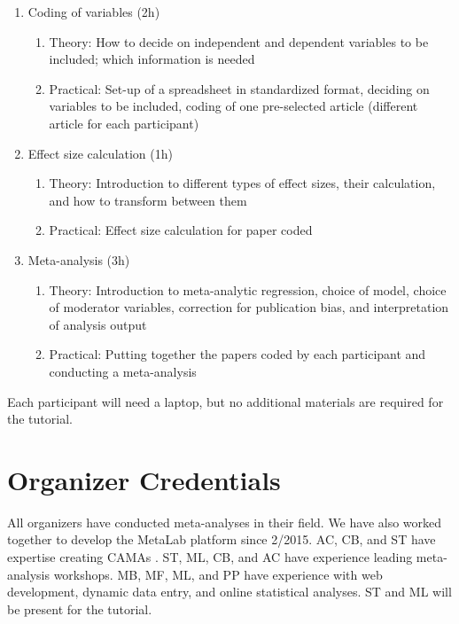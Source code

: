 \documentclass[10pt,letterpaper]{article}
\begin{document}
\begin{enumerate}
    \item Coding of variables (2h)
    \begin{enumerate}
        \item Theory: How to decide on independent and dependent variables to be included; which information is needed
        \item Practical: Set-up of a spreadsheet in standardized format, deciding on variables to be included, coding of one pre-selected article (different article for each participant)
    \end{enumerate}
    \item Effect size calculation (1h)
    \begin{enumerate}
        \item Theory: Introduction to different types of effect sizes, their calculation, and how to transform between them
        \item Practical: Effect size calculation for paper coded
    \end{enumerate}
    \item Meta-analysis (3h)%
    \begin{enumerate}
        \item Theory: Introduction to meta-analytic regression, choice of model, choice of moderator variables, correction for publication bias, and interpretation of analysis output
       \item Practical: Putting together the papers coded by each participant and conducting a meta-analysis
        \end{enumerate}
\end{enumerate}

Each participant will need a laptop, but no additional materials are required for the tutorial.


\section{Organizer Credentials}
 All organizers have conducted meta-analyses in their field. We have also worked together to develop the MetaLab platform since 2/2015. AC, CB, and ST have expertise creating CAMAs \cite{tsuji2014community}. ST, ML, CB, and AC have experience leading meta-analysis workshops. MB, MF, ML, and PP have experience with web development, dynamic data entry, and online statistical analyses. ST and ML will be present for the tutorial. 




\setlength{\bibleftmargin}{.125in}
\setlength{\bibindent}{-\bibleftmargin}


\end{document}

